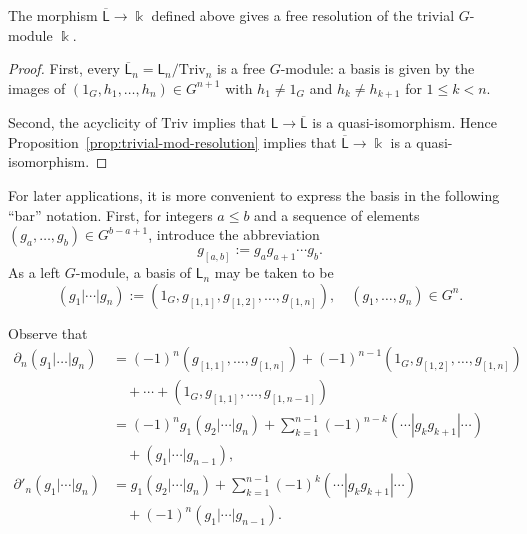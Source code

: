\begin{proposition}\label{prop:trivial-mod-nor-resolution}
	The morphism $\overline{\mathsf{L}}\to\Bbbk$ defined above gives a free
	resolution of the trivial $G$-module $\Bbbk$.
\end{proposition}

\begin{proof}
	First, every
	$\overline{\mathsf{L}}_n=\mathsf{L}_n/\mathrm{Triv}_n$ is a free
	$G$-module: a basis is given by the images of
	$(1_G,h_1,\ldots,h_n)\in G^{n+1}$ with $h_1\neq1_G$ and
	$h_k\neq h_{k+1}$ for $1\leq k<n$.

	Second, the acyclicity of $\mathrm{Triv}$ implies that
	$\mathsf{L}\to\overline{\mathsf{L}}$ is a quasi-isomorphism. Hence
	Proposition~\ref{prop:trivial-mod-resolution} implies that
	$\overline{\mathsf{L}}\to\Bbbk$ is a quasi-isomorphism.
\end{proof}

For later applications, it is more convenient to express the basis in the
following ``bar'' notation. First, for integers $a\leq b$ and a sequence of
elements $(g_a,\ldots,g_b)\in G^{b-a+1}$, introduce the abbreviation
\[ g_{[a, b]} := g_a g_{a+1} \cdots g_b. \]
As a left $G$-module, a basis of $\mathsf{L}_n$ may be taken to be
\begin{equation}\label{eqn:L-basis}
	(g_1 | \cdots | g_n) := \left( 1_G, g_{[1, 1]}, g_{[1, 2]}, \ldots, g_{[1, n]} \right), \quad (g_1, \ldots, g_n) \in G^n.
\end{equation}

Observe that
\begin{equation}\label{eqn:L-basis-partial}\begin{aligned}
	\partial_n (g_1 | \ldots | g_n) & = (-1)^n \left( g_{[1, 1]}, \ldots, g_{[1, n]}\right) + (-1)^{n-1} \left(1_G, g_{[1, 2]}, \ldots, g_{[1, n]}\right) \\
	& \quad + \cdots + \left( 1_G, g_{[1, 1]}, \ldots, g_{[1, n-1]}\right) \\
	& = (-1)^n g_1 (g_2 | \cdots | g_n) + \sum_{k=1}^{n-1} (-1)^{n-k} (\cdots | g_k g_{k+1}| \cdots) \\
	& \quad + (g_1 | \cdots |g_{n-1}), \\
	\partial'_n(g_1 | \cdots | g_n) & = g_1 (g_2 | \cdots | g_n) + \sum_{k=1}^{n-1} (-1)^k (\cdots | g_k g_{k+1}| \cdots) \\
	& \quad + (-1)^n (g_1 | \cdots |g_{n-1}).
\end{aligned}\end{equation}

